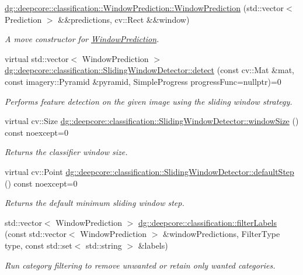 \begin{DoxyCompactItemize}
\hyperlink{group___classification_module_ga22fb55b25a1827cd37a05b7ac72edc2c}{dg\+::deepcore\+::classification\+::\+Window\+Prediction\+::\+Window\+Prediction} (std\+::vector$<$ Prediction $>$ \&\&predictions, cv\+::\+Rect \&\&window)
\begin{DoxyCompactList}\small\item\em A move constructor for \hyperlink{structdg_1_1deepcore_1_1classification_1_1_window_prediction}{Window\+Prediction}. \end{DoxyCompactList}\item 
virtual std\+::vector$<$ Window\+Prediction $>$ \hyperlink{group___classification_module_ga359de047765fb32d9a6f537bf8a4c1f3}{dg\+::deepcore\+::classification\+::\+Sliding\+Window\+Detector\+::detect} (const cv\+::\+Mat \&mat, const imagery\+::\+Pyramid \&pyramid, Simple\+Progress progress\+Func=nullptr)=0
\begin{DoxyCompactList}\small\item\em Performs feature detection on the given image using the sliding window strategy. \end{DoxyCompactList}\item 
virtual cv\+::\+Size \hyperlink{group___classification_module_ga35c268eb743bfbfb5d77d30ddbcc48e5}{dg\+::deepcore\+::classification\+::\+Sliding\+Window\+Detector\+::window\+Size} () const noexcept=0
\begin{DoxyCompactList}\small\item\em Returns the classifier window size. \end{DoxyCompactList}\item 
virtual cv\+::\+Point \hyperlink{group___classification_module_ga8e430c585fe3d3bcba00c21f418752d2}{dg\+::deepcore\+::classification\+::\+Sliding\+Window\+Detector\+::default\+Step} () const noexcept=0
\begin{DoxyCompactList}\small\item\em Returns the default minimum sliding window step. \end{DoxyCompactList}\item 
std\+::vector$<$ Window\+Prediction $>$ \hyperlink{group___classification_module_ga099af7f7bc5f6030c39c39f3f8fdcf8d}{dg\+::deepcore\+::classification\+::filter\+Labels} (const std\+::vector$<$ Window\+Prediction $>$ \&window\+Predictions, Filter\+Type type, const std\+::set$<$ std\+::string $>$ \&labels)
\begin{DoxyCompactList}\small\item\em Run category filtering to remove unwanted or retain only wanted categories. \end{DoxyCompactList}\item 

\end{DoxyCompactItemize}
